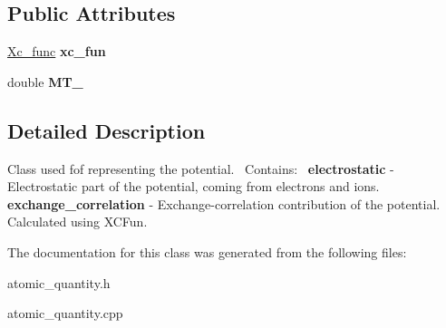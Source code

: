 \subsection*{Public Attributes}
\begin{DoxyCompactItemize}
\item 
\mbox{\label{classPotential_a6a99f6673af280be1d6eb3d6e0a963bb}} 
\hyperlink{classXc__func}{Xc\+\_\+func} {\bfseries xc\+\_\+fun}
\item 
\mbox{\label{classPotential_ac5b5f48ce4b61208c59282d00d1b0752}} 
double {\bfseries M\+T\+\_}
\end{DoxyCompactItemize}


\subsection{Detailed Description}
Class used fof representing the potential.~\newline
Contains\+:~\newline
{\bfseries electrostatic} -\/ Electrostatic part of the potential, coming from electrons and ions.~\newline
{\bfseries exchange\+\_\+correlation} -\/ Exchange-\/correlation contribution of the potential. Calculated using X\+C\+Fun.~\newline


The documentation for this class was generated from the following files\+:\begin{DoxyCompactItemize}
\item 
atomic\+\_\+quantity.\+h\item 
atomic\+\_\+quantity.\+cpp\end{DoxyCompactItemize}
